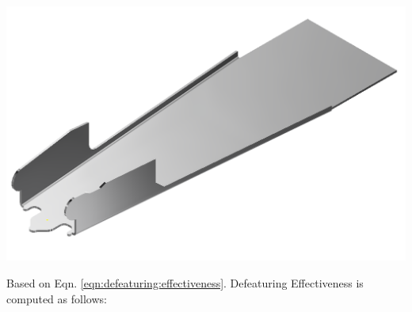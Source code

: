 
%
%


\begin{minipage}{\linewidth}
\begin{minipage}[c]{0.62\linewidth}
\includegraphics[width=\linewidth,valign=t]{images/StaplerLower_defeatured_model}
 \label{fig:results:staplerlowerdefeatmodel}


Based on Eqn. \ref{eqn:defeaturing:effectiveness}. Defeaturing Effectiveness is computed as follows:


\end{minipage}
\end{minipage}
